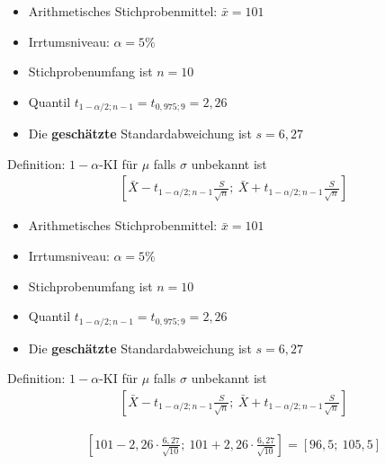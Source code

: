 \documentclass[t,11pt]{beamer}
\begin{document}
\begin{frame}
\begin{itemize}
	\item Arithmetisches Stichprobenmittel: $\bar{x} = 101$
	\item Irrtumsniveau: $\alpha=5\%$
	\item Stichprobenumfang ist $n=10$
	\item Quantil $t_{1-\alpha/2; n-1} = t_{0,975;9} = 2,26$
	\item Die \textbf{geschätzte} Standardabweichung ist $s=6,27$
\end{itemize}
\begin{alertblock}{Definition: $1-\alpha$-KI für $\mu$ falls $\sigma$ unbekannt ist}
	\begin{align*}
	\left[ \bar{X} - t_{1-\alpha/2; n-1} \frac{S}{\sqrt{n}};~\bar{X} + t_{1-\alpha/2; n-1} \frac{S}{\sqrt{n}} \right]
	\end{align*}
\end{alertblock}
\end{frame}

\begin{frame}
\begin{itemize}
	\item Arithmetisches Stichprobenmittel: $\bar{x} = 101$
	\item Irrtumsniveau: $\alpha=5\%$
	\item Stichprobenumfang ist $n=10$
	\item Quantil $t_{1-\alpha/2; n-1} = t_{0,975;9} = 2,26$
	\item Die \textbf{geschätzte} Standardabweichung ist $s=6,27$
\end{itemize}
\begin{alertblock}{Definition: $1-\alpha$-KI für $\mu$ falls $\sigma$ unbekannt ist}
	\begin{align*}
	\left[ \bar{X} - t_{1-\alpha/2; n-1} \frac{S}{\sqrt{n}};~\bar{X} + t_{1-\alpha/2; n-1} \frac{S}{\sqrt{n}} \right]
	\end{align*}
\end{alertblock}
\begin{align*}
\left[ 101 - 2,26\cdot \frac{6,27}{\sqrt{10}};~ 101 + 2,26\cdot \frac{6,27}{\sqrt{10}} \right] = \left[ 96,5;~105,5 \right]
\end{align*}
\end{frame}
\end{document}
